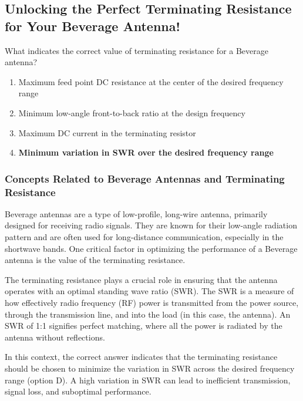 \subsection{Unlocking the Perfect Terminating Resistance for Your Beverage Antenna!}

\begin{tcolorbox}[colback=gray!10, colframe=black, title=E9H06] What indicates the correct value of terminating resistance for a Beverage antenna?\\
\begin{enumerate}[label=\Alph*.]
    \item Maximum feed point DC resistance at the center of the desired frequency range
    \item Minimum low-angle front-to-back ratio at the design frequency
    \item Maximum DC current in the terminating resistor
    \item \textbf{Minimum variation in SWR over the desired frequency range}
\end{enumerate} \end{tcolorbox}

\subsubsection{Concepts Related to Beverage Antennas and Terminating Resistance}

Beverage antennas are a type of low-profile, long-wire antenna, primarily designed for receiving radio signals. They are known for their low-angle radiation pattern and are often used for long-distance communication, especially in the shortwave bands. One critical factor in optimizing the performance of a Beverage antenna is the value of the terminating resistance.

The terminating resistance plays a crucial role in ensuring that the antenna operates with an optimal standing wave ratio (SWR). The SWR is a measure of how effectively radio frequency (RF) power is transmitted from the power source, through the transmission line, and into the load (in this case, the antenna). An SWR of 1:1 signifies perfect matching, where all the power is radiated by the antenna without reflections.

In this context, the correct answer indicates that the terminating resistance should be chosen to minimize the variation in SWR across the desired frequency range (option D). A high variation in SWR can lead to inefficient transmission, signal loss, and suboptimal performance.

